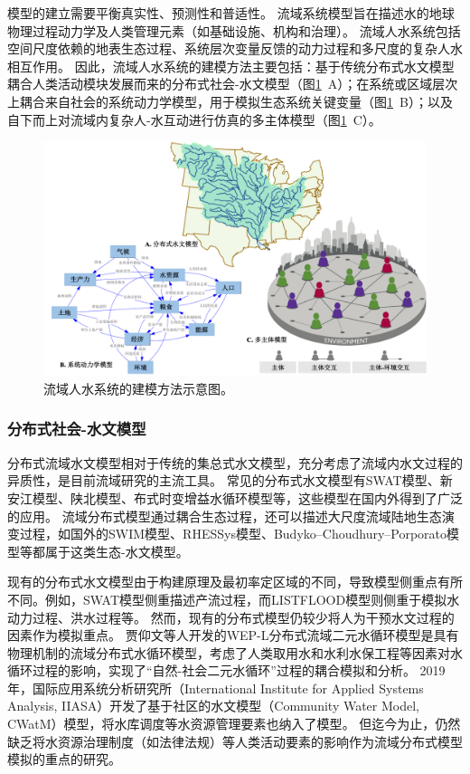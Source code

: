 
模型的建立需要平衡真实性、预测性和普适性\cite{gunderson2017}。
流域系统模型旨在描述水的地球物理过程动力学及人类管理元素（如基础设施、机构和治理）\cite{hadjimichael2020}。
流域人水系统包括空间尺度依赖的地表生态过程、系统层次变量反馈的动力过程和多尺度的复杂人水相互作用\cite{bodin2017b,sayles2017,sayles2019}。
因此，流域人水系统的建模方法主要包括：基于传统分布式水文模型耦合人类活动模块发展而来的分布式社会-水文模型（图\ref{ch1:fig:models}~A）；在系统或区域层次上耦合来自社会的系统动力学模型，用于模拟生态系统关键变量（图\ref{ch1:fig:models}~B）；以及自下而上对流域内复杂人-水互动进行仿真的多主体模型（图\ref{ch1:fig:models}~C）。

\begin{figure}[htb]
    \centering
    \includegraphics[width=\textwidth]{img/ch1/ch1_models.png}
    \caption[流域人水系统的建模方法示意图]{流域人水系统的建模方法示意图。}\label{ch1:fig:models}
\end{figure}

\subsubsection*{分布式社会-水文模型}

分布式流域水文模型相对于传统的集总式水文模型，充分考虑了流域内水文过程的异质性\cite{wangzhonggen2003}，是目前流域研究的主流工具。
常见的分布式水文模型有SWAT模型、新安江模型、陕北模型、布式时变增益水循环模型等，这些模型在国内外得到了广泛的应用\cite{arnold1998,xiajun2003,ficklin2009}。
流域分布式模型通过耦合生态过程，还可以描述大尺度流域陆地生态演变过程，如国外的SWIM模型\cite{krysanova2005}、RHESSys模型\cite{tague2004}、Budyko–Choudhury–Porporato模型\cite{donohue2012}等都属于这类生态-水文模型。

现有的分布式水文模型由于构建原理及最初率定区域的不同，导致模型侧重点有所不同。例如，SWAT模型侧重描述产流过程\cite{wangzhonggen2003a}，而LISTFLOOD模型则侧重于模拟水动力过程、洪水过程等\cite{zengzhaoyang2017}。
然而，现有的分布式模型仍较少将人为干预水文过程的因素作为模拟重点。
贾仰文等人开发的WEP-L分布式流域二元水循环模型是具有物理机制的流域分布式水循环模型，考虑了人类取用水和水利水保工程等因素对水循环过程的影响，实现了“自然-社会二元水循环”过程的耦合模拟和分析\cite{jia2010}。
2019年，国际应用系统分析研究所（International Institute for Applied Systems Analysis, IIASA）开发了基于社区的水文模型（Community Water Model, CWatM）模型，将水库调度等水资源管理要素也纳入了模型\cite{burek2020}。
但迄今为止，仍然缺乏将水资源治理制度（如法律法规）等人类活动要素的影响作为流域分布式模型模拟的重点的研究。

